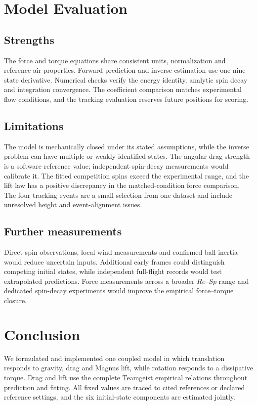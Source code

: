 \documentclass[12pt,letterpaper]{article}
\begin{document}
\section{Model Evaluation}
\subsection{Strengths}
The force and torque equations share consistent units, normalization and reference air properties. Forward prediction and inverse estimation use one nine-state derivative. Numerical checks verify the energy identity, analytic spin decay and integration convergence. The coefficient comparison matches experimental flow conditions, and the tracking evaluation reserves future positions for scoring.
\subsection{Limitations}
The model is mechanically closed under its stated assumptions, while the inverse problem can have multiple or weakly identified states. The angular-drag strength is a software reference value; independent spin-decay measurements would calibrate it. The fitted competition spins exceed the experimental range, and the lift law has a positive discrepancy in the matched-condition force comparison. The four tracking events are a small selection from one dataset and include unresolved height and event-alignment issues.
\subsection{Further measurements}
Direct spin observations, local wind measurements and confirmed ball inertia would reduce uncertain inputs. Additional early frames could distinguish competing initial states, while independent full-flight records would test extrapolated predictions. Force measurements across a broader $Re$--$Sp$ range and dedicated spin-decay experiments would improve the empirical force--torque closure.

\section{Conclusion}
We formulated and implemented one coupled model in which translation responds to gravity, drag and Magnus lift, while rotation responds to a dissipative torque. Drag and lift use the complete Teamgeist empirical relations throughout prediction and fitting. All fixed values are traced to cited references or declared reference settings, and the six initial-state components are estimated jointly.
\end{document}
